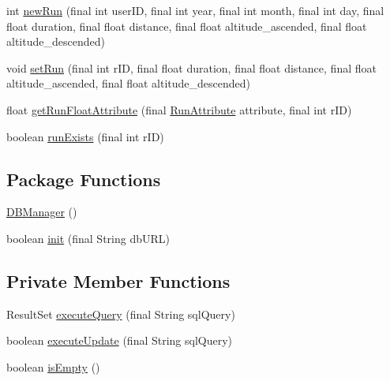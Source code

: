 \begin{DoxyCompactItemize}
\item 
int \hyperlink{classcom_1_1activitytracker_1_1_d_b_manager_a05b742f583167f6ce00eb8415c43fc1c}{new\+Run} (final int user\+ID, final int year, final int month, final int day, final float duration, final float distance, final float altitude\+\_\+ascended, final float altitude\+\_\+descended)
\item 
void \hyperlink{classcom_1_1activitytracker_1_1_d_b_manager_a72282377a552ce4ce371abff02e312f2}{set\+Run} (final int r\+ID, final float duration, final float distance, final float altitude\+\_\+ascended, final float altitude\+\_\+descended)
\item 
float \hyperlink{classcom_1_1activitytracker_1_1_d_b_manager_a666452f1e5862f90c06b0beb9a9fcfdd}{get\+Run\+Float\+Attribute} (final \hyperlink{enumcom_1_1activitytracker_1_1_run_attribute}{Run\+Attribute} attribute, final int r\+ID)
\item 
boolean \hyperlink{classcom_1_1activitytracker_1_1_d_b_manager_a723ac1c573bacdd0b62894357bd65a9b}{run\+Exists} (final int r\+ID)
\end{DoxyCompactItemize}
\subsection*{Package Functions}
\begin{DoxyCompactItemize}
\item 
\hyperlink{classcom_1_1activitytracker_1_1_d_b_manager_ac1f558ef56fe02d74fe103a473a15bb5}{D\+B\+Manager} ()
\item 
boolean \hyperlink{classcom_1_1activitytracker_1_1_d_b_manager_a41df4600bb5901a26a4ea6a7108a70b9}{init} (final String db\+U\+RL)
\end{DoxyCompactItemize}
\subsection*{Private Member Functions}
\begin{DoxyCompactItemize}
\item 
Result\+Set \hyperlink{classcom_1_1activitytracker_1_1_d_b_manager_adef71a18dc05536d80e83311841e1953}{execute\+Query} (final String sql\+Query)
\item 
boolean \hyperlink{classcom_1_1activitytracker_1_1_d_b_manager_a382397e2bdf309901d1c80ff66be69b7}{execute\+Update} (final String sql\+Query)
\item 
boolean \hyperlink{classcom_1_1activitytracker_1_1_d_b_manager_af9ab112f840e3c803b6b28a2f1a15215}{is\+Empty} ()
\end{DoxyCompactItemize}
